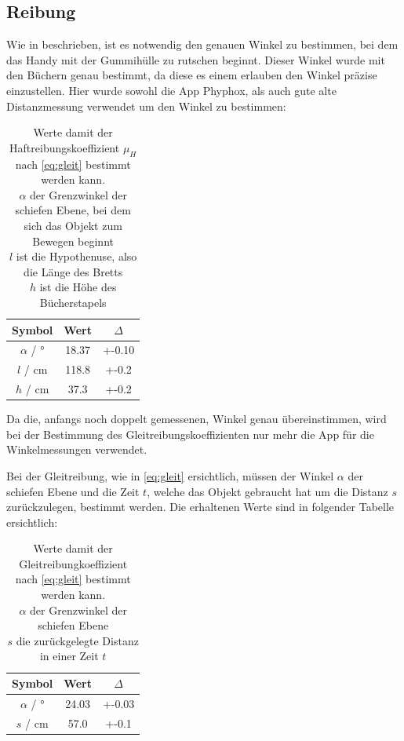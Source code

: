 \documentclass[11pt,ngerman]{scrartcl}
\begin{document}
\subsection{Reibung}
Wie in  beschrieben, ist
es notwendig den genauen Winkel zu bestimmen, bei dem das Handy mit
der Gummihülle zu rutschen beginnt. Dieser Winkel 
wurde mit den Büchern genau bestimmt, da diese es einem erlauben
den Winkel präzise einzustellen. Hier wurde sowohl 
die App Phyphox, als auch gute alte Distanzmessung verwendet um den
Winkel zu bestimmen:

\begin{table}[H]
    \centering
    \caption{Werte damit der Haftreibungskoeffizient $\mu_H$ nach
        \autoref{eq:gleit} bestimmt werden 
    kann. \\
    $\alpha$ der Grenzwinkel der schiefen Ebene, bei dem sich das Objekt zum Bewegen beginnt\\
    $l$ ist die Hypothenuse, also die Länge des Bretts \\
    $h$ ist die Höhe des Bücherstapels \\
}
    \label{tab:messwerte_haft}
    \begin{tabular}{c|S|S}
        Symbol & {Wert} & {$\Delta$} \\ \hline
        $\alpha$ / \si{\degree} & 18.37 & +-0.10 \\
        $l$ / \si{\cm} & 118.8 & +-0.2 \\
        $h$ / \si{\cm} & 37.3 & +-0.2 \\
    \end{tabular}
\end{table}

Da die, anfangs noch doppelt gemessenen, Winkel genau übereinstimmen, wird bei
der Bestimmung des Gleitreibungskoeffizienten nur mehr die App für die
Winkelmessungen verwendet.

Bei der Gleitreibung, wie in \autoref{eq:gleit} ersichtlich, müssen der Winkel
$\alpha$ der schiefen Ebene und die Zeit $t$, welche das Objekt gebraucht hat um
die Distanz $s$ zurückzulegen, bestimmt werden. Die erhaltenen
Werte sind in folgender Tabelle ersichtlich:

\begin{table}[H]
    \centering
    \caption{Werte damit der Gleitreibungkoeffizient nach \autoref{eq:gleit} bestimmt werden 
    kann. \\
    $\alpha$ der Grenzwinkel der schiefen Ebene \\
    $s$ die zurückgelegte Distanz in einer Zeit $t$ \\
}
    \label{tab:messwerte_gleit}
    \begin{tabular}{c|S|S}
        Symbol & {Wert} & {$\Delta$} \\ \hline
        $\alpha$ / \si{\degree} & 24.03 & +-0.03\\
        $s$ / \si{\cm} & 57.0 & +-0.1 \\
    \end{tabular}
\end{table}
\end{document}
